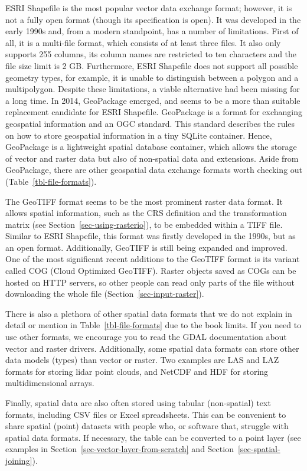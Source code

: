 \documentclass[
  letterpaper,
]{krantz}
\begin{document}
ESRI Shapefile is the most popular vector data exchange format; however,
it is not a fully open format (though its specification is open). It was
developed in the early 1990s and, from a modern standpoint, has a number
of limitations. First of all, it is a multi-file format, which consists
of at least three files. It also only supports 255 columns, its column
names are restricted to ten characters and the file size limit is 2 GB.
Furthermore, ESRI Shapefile does not support all possible geometry
types, for example, it is unable to distinguish between a polygon and a
multipolygon. Despite these limitations, a viable alternative had been
missing for a long time. In 2014, GeoPackage emerged, and seems to be a
more than suitable replacement candidate for ESRI Shapefile. GeoPackage
is a format for exchanging geospatial information and an OGC standard.
This standard describes the rules on how to store geospatial information
in a tiny SQLite container. Hence, GeoPackage is a lightweight spatial
database container, which allows the storage of vector and raster data
but also of non-spatial data and extensions. Aside from GeoPackage,
there are other geospatial data exchange formats worth checking out
(Table~\ref{tbl-file-formats}).

The GeoTIFF format seems to be the most prominent raster data format. It
allows spatial information, such as the CRS definition and the
transformation matrix (see Section~\ref{sec-using-rasterio}), to be
embedded within a TIFF file. Similar to ESRI Shapefile, this format was
firstly developed in the 1990s, but as an open format. Additionally,
GeoTIFF is still being expanded and improved. One of the most
significant recent additions to the GeoTIFF format is its variant called
COG (Cloud Optimized GeoTIFF). Raster objects saved as COGs can be
hosted on HTTP servers, so other people can read only parts of the file
without downloading the whole file (Section~\ref{sec-input-raster}).

There is also a plethora of other spatial data formats that we do not
explain in detail or mention in Table~\ref{tbl-file-formats} due to the
book limits. If you need to use other formats, we encourage you to read
the GDAL documentation about vector and raster drivers. Additionally,
some spatial data formats can store other data models (types) than
vector or raster. Two examples are LAS and LAZ formats for storing lidar
point clouds, and NetCDF and HDF for storing multidimensional arrays.

Finally, spatial data are also often stored using tabular (non-spatial)
text formats, including CSV files or Excel spreadsheets. This can be
convenient to share spatial (point) datasets with people who, or
software that, struggle with spatial data formats. If necessary, the
table can be converted to a point layer (see examples in
Section~\ref{sec-vector-layer-from-scratch} and
Section~\ref{sec-spatial-joining}).
\end{document}
